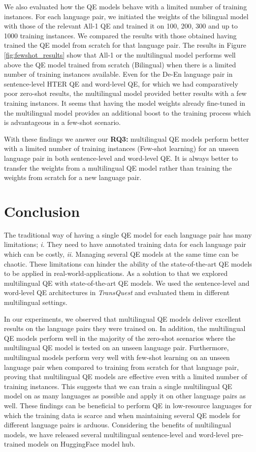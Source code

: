 We also evaluated how the QE models behave with a limited number of training instances. For each language pair, we initiated the weights of the bilingual model with those of the relevant All-1 QE and trained it on 100, 200, 300 and up to 1000 training instances. We compared the results with those obtained having trained the QE model from scratch for that language pair. The results in Figure \ref{fig:fewshot_results} show that All-1 or the multilingual model performs well above the QE model trained from scratch (Bilingual) when there is a limited number of training instances available. Even for the De-En language pair in sentence-level HTER QE and word-level QE, for which we had comparatively poor zero-shot results, the multilingual model provided better results with a few training instances. It seems that having the model weights already fine-tuned in the multilingual model provides an additional boost to the training process which is advantageous in a few-shot scenario.

With these findings we answer our \textbf{RQ3:} multilingual QE models perform better with a limited number of training instances (Few-shot learning) for an unseen language pair in both sentence-level and word-level QE. It is always better to transfer the weights from a multilingual QE model rather than training the weights from scratch for a new language pair.


\section{Conclusion}
\label{sec:multilingual_conclusion}
The traditional way of having a single QE model for each language pair has many limitations; \textit{i. }They need to have annotated training data for each language pair which can be costly, \textit{ii. }Managing several QE models at the same time can be chaotic.  These limitations can hinder the ability of the state-of-the-art QE models to be applied in real-world-applications. As a solution to that we explored multilingual QE with state-of-the-art QE models. We used the sentence-level and word-level QE architectures in \textit{TransQuest} and evaluated them in different multilingual settings. 

In our experiments, we observed that multilingual QE models deliver excellent results on the language pairs they were trained on. In addition, the multilingual QE models perform well in the majority of the zero-shot scenarios where the multilingual QE model is tested on an unseen language pair. Furthermore, multilingual models perform very well with few-shot learning on an unseen language pair when compared to training from scratch for that language pair, proving that multilingual QE models are effective even with a limited number of training instances. This suggests that we can train a single multilingual QE model on as many languages as possible and apply it on other language pairs as well. These findings can be beneficial to perform QE in low-resource languages for which the training data is scarce and when maintaining several QE models for different language pairs is arduous. Considering the benefits of multilingual models, we have released several multilingual sentence-level and word-level pre-trained models on HuggingFace model hub. 

